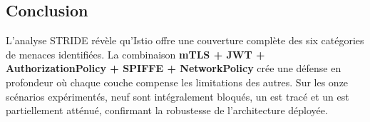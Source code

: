 \begin{samepage}
\section*{Conclusion}

L'analyse STRIDE révèle qu'Istio offre une couverture complète des six catégories
de menaces identifiées. La combinaison \textbf{mTLS + JWT + AuthorizationPolicy
+ SPIFFE + NetworkPolicy} crée une défense en profondeur où chaque couche
compense les limitations des autres. Sur les onze scénarios expérimentés, neuf
sont intégralement bloqués, un est tracé et un est partiellement atténué,
confirmant la robustesse de l'architecture déployée.
\end{samepage}
